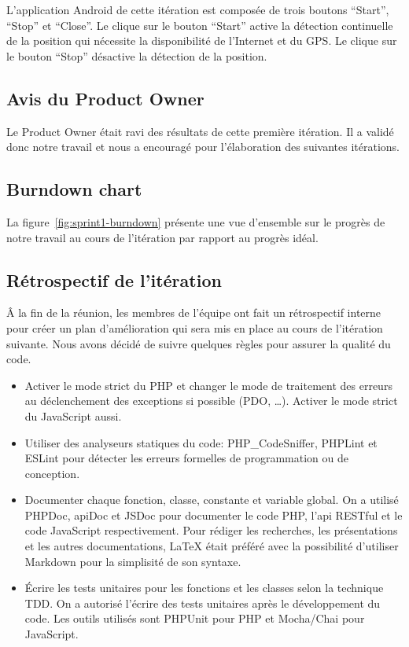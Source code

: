 L'application Android de cette itération est composée de trois
boutons ``Start'', ``Stop'' et ``Close''.  Le clique sur le bouton ``Start''
active la détection continuelle de la position qui nécessite la disponibilité
de l'Internet et du \acrshort{GPS}.  Le clique sur le bouton ``Stop'' désactive
la détection de la position.

\subsection{Avis du Product Owner}

Le Product Owner était ravi des résultats de cette première itération. Il a
validé donc notre travail et nous a encouragé pour l'élaboration des suivantes
itérations.

\subsection{Burndown chart}

La figure~\ref{fig:sprint1-burndown} présente une vue d'ensemble sur le progrès
de notre travail au cours de l'itération par rapport au progrès idéal.



\subsection{Rétrospectif de l'itération}

Â la fin de la réunion, les membres de l'équipe ont fait un rétrospectif interne pour
créer un plan d'amélioration qui sera mis en place au cours de l'itération suivante.
Nous avons décidé de suivre quelques règles pour assurer la qualité du code.

\begin{itemize}
    \item Activer le mode strict du PHP et changer le mode de traitement des
        erreurs au déclenchement des exceptions si possible (PDO, \ldots).
        Activer le mode strict du JavaScript aussi.
    \item Utiliser des analyseurs statiques du code: PHP\_CodeSniffer, PHPLint
        et ESLint pour détecter les erreurs formelles de programmation ou de
        conception.
    \item Documenter chaque fonction, classe, constante et variable global. On
        a utilisé PHPDoc, apiDoc et JSDoc pour documenter le code PHP, l'api
        RESTful et le code JavaScript respectivement. Pour rédiger les
        recherches, les présentations et les autres documentations, \LaTeX{}
        était préféré avec la possibilité d'utiliser Markdown pour la
        simplisité de son syntaxe.
    \item Écrire les tests unitaires pour les fonctions et les classes selon la
        technique \acrshort{TDD}. On a autorisé l'écrire des tests unitaires
        après le développement du code. Les outils utilisés sont PHPUnit pour
        PHP et Mocha/Chai pour JavaScript.
\end{itemize}

